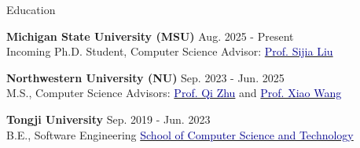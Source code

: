 \begin{rSection}{Education}
\small{{\bf Michigan State University (MSU)} \hfill Aug. 2025 - Present
\\ Incoming Ph.D. Student, Computer Science \hfill Advisor: \href{https://lsjxjtu.github.io/index.html}{\textcolor{darkblue}{Prof. Sijia Liu}} 

\vspace{-2mm}
{\bf Northwestern University (NU)} \hfill Sep. 2023 - Jun. 2025
\\ M.S., Computer Science \hfill Advisors:  \href{https://scholar.google.com/citations?user=TN09YMcAAAAJ&hl=en}{\textcolor{darkblue}{Prof. Qi Zhu}} and \href{https://wangxiao1254.github.io/}{\textcolor{darkblue}{Prof. Xiao Wang}}

\vspace{-2mm}
{\bf Tongji University} \hfill Sep. 2019 - Jun. 2023
\\ B.E., Software Engineering \hfill \href{https://cs.tongji.edu.cn/}{\textcolor{darkblue}{School of Computer Science and Technology}}} \\
\vspace{-5.0mm}

\end{rSection}
